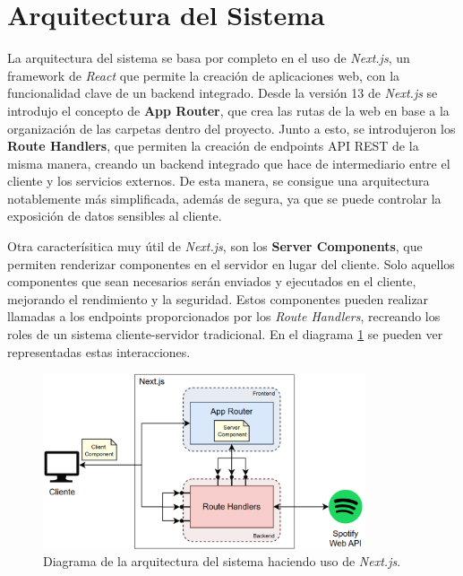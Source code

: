 \section{Arquitectura del Sistema}

La arquitectura del sistema se basa por completo en el uso de \textit{Next.js}, un framework de \textit{React} que permite la creación de aplicaciones web, con la funcionalidad clave de un backend integrado. Desde la versión 13 de \textit{Next.js} se introdujo el concepto de \textbf{App Router}, que crea las rutas de la web en base a la organización de las carpetas dentro del proyecto. Junto a esto, se introdujeron los \textbf{Route Handlers}, que permiten la creación de endpoints API REST de la misma manera, creando un backend integrado que hace de intermediario entre el cliente y los servicios externos. De esta manera, se consigue una arquitectura notablemente más simplificada, además de segura, ya que se puede controlar la exposición de datos sensibles al cliente.

Otra caracterísitica muy útil de \textit{Next.js}, son los \textbf{Server Components}, que permiten renderizar componentes en el servidor en lugar del cliente. Solo aquellos componentes que sean necesarios serán enviados y ejecutados en el cliente, mejorando el rendimiento y la seguridad. Estos componentes pueden realizar llamadas a los endpoints proporcionados por los \textit{Route Handlers}, recreando los roles de un sistema cliente-servidor tradicional. En el diagrama \ref{fig:arquitectura_sistema} se pueden ver representadas estas interacciones.

\begin{figure}[H]
    \centering
    \includegraphics[width=0.85\textwidth]{figures/arquitectura_sistema.png}
    \caption{Diagrama de la arquitectura del sistema haciendo uso de \textit{Next.js}.}
    \label{fig:arquitectura_sistema}
\end{figure}

